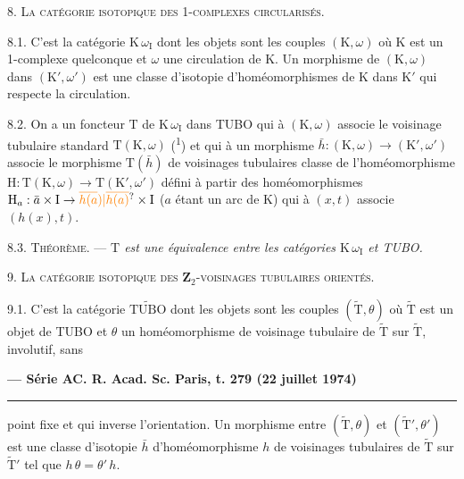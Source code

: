 8. \textsc{La catégorie isotopique des 1-complexes circularisés.}

8.1. C'est la catégorie \(\mathrm{K}\,\omega_{\mathrm{I}}\) dont les objets sont les couples \((\mathrm{K},\omega)\) où \(\mathrm{K}\) est un 1-complexe quelconque et \(\omega\) une circulation de \(\mathrm{K}\). Un morphisme de \((\mathrm{K},\omega)\) dans \((\mathrm{K}',\omega')\) est une classe d'isotopie d'homéomorphismes de \(\mathrm{K}\) dans \(\mathrm{K}'\) qui respecte la circulation.

8.2. On a un foncteur \(\mathrm{T}\) de \(\mathrm{K}\,\omega_{\mathrm{I}}\) dans TUBO qui à \((\mathrm{K},\omega)\) associe le voisinage tubulaire standard \(\mathrm{T}(\mathrm{K},\omega)\) (\textsuperscript{1}) et qui à un morphisme \(\bar h:(\mathrm{K},\omega)\to(\mathrm{K}',\omega')\) associe le morphisme \(\mathrm{T}(\bar h)\) de voisinages tubulaires classe de l'homéomorphisme \(\mathrm{H}:\mathrm{T}(\mathrm{K},\omega)\to\mathrm{T}(\mathrm{K}',\omega')\) défini à partir des homéomorphismes \(\mathrm{H}_a:\bar a\times\mathrm{I}\to\unsure{\overline{h(a})|\overline{h(a)}}\times\mathrm{I}\) (\(a\) étant un arc de \(\mathrm{K}\)) qui à \((x,t)\) associe \((h(x),t)\).


8.3. \textsc{Théorème.} --- \textit{\(\mathrm{T}\) est une équivalence entre les catégories \(\mathrm{K}\,\omega_{\mathrm{I}}\) et TUBO.}

9. \textsc{La catégorie isotopique des \(\mathbf{Z}_2\)-voisinages tubulaires orientés.}

9.1. C'est la catégorie \(\widetilde{\mathrm{TUBO}}\) dont les objets sont les couples \((\widetilde{\mathrm{T}},\theta)\) où \(\widetilde{\mathrm{T}}\) est un objet de TUBO et \(\theta\) un homéomorphisme de voisinage tubulaire de \(\widetilde{\mathrm{T}}\) sur \(\widetilde{\mathrm{T}}\), involutif, sans

\textbf{--- Série A}\hfill\textbf{C. R. Acad. Sc. Paris, t. 279 (22 juillet 1974)}\par\noindent\rule{\linewidth}{.35pt}\par

point fixe et qui inverse l'orientation. Un morphisme entre \((\widetilde{\mathrm{T}},\theta)\) et \((\widetilde{\mathrm{T}}',\theta')\) est une classe d'isotopie \(\bar h\) d'homéomorphisme \(h\) de voisinages tubulaires de \(\widetilde{\mathrm{T}}\) sur \(\widetilde{\mathrm{T}}'\) tel que \(h\,\theta=\theta'\,h\).

